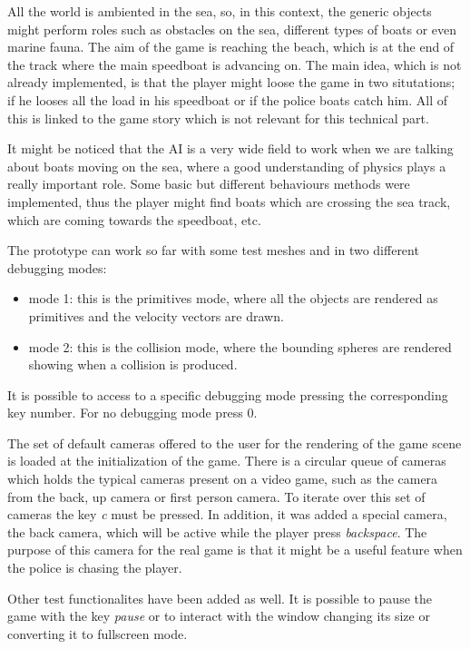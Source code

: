 \documentclass[]{article}
\begin{document}
All the world is ambiented in the sea, so, in this context, the generic objects might perform roles such as obstacles on the sea, different types of boats or even marine fauna. The aim of the game is reaching the beach, which is at the end of the track where the main speedboat is advancing on. The main idea, which is not already implemented, is that the player might loose the game in two situtations; if he looses all the load in his speedboat or if the police boats catch him. All of this is linked to the game story which is not relevant for this technical part.

It might be noticed that the AI is a very wide field to work when we are talking about boats moving on the sea, where a good understanding of physics plays a really important role. Some basic but different behaviours methods were implemented, thus the player might find boats which are crossing the sea track, which are coming towards the speedboat, etc. 

The prototype can work so far with some test meshes and in two different debugging modes:

\begin{itemize}
\item mode 1: this is the primitives mode, where all the objects are rendered as primitives and the velocity vectors are drawn.
\item mode 2: this is the collision mode, where the bounding spheres are rendered showing when a collision is produced.
\end{itemize}

It is possible to access to a specific debugging mode pressing the corresponding key number. For no debugging mode press 0.

The set of default cameras offered to the user for the rendering of the game scene is loaded at the initialization of the game. There is a circular queue of cameras which holds the typical cameras present on a video game, such as the camera from the back, up camera or first person camera. To iterate over this set of cameras the key \emph{c} must be pressed. In addition, it was added a special camera, the back camera, which will be active while the player press \emph{backspace}. The purpose of this camera for the real game is that it might be a useful feature when the police is chasing the player.

Other test functionalites have been added as well. It is possible to pause the game with the key \emph{pause} or to interact with the window changing its size or converting it to fullscreen mode.
\end{document}
